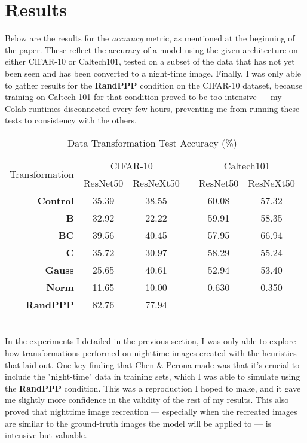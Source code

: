 \documentclass{article}
\begin{document}
\section{Results}
Below are the results for the \textit{accuracy} metric, as mentioned at the beginning of the paper. These reflect the accuracy of a model using the given architecture on either CIFAR-10 or Caltech101, tested on a subset of the data that has not yet been seen and has been converted to a night-time image. Finally, I was only able to gather results for the \textbf{RandPPP} condition on the CIFAR-10 dataset, because training on Caltech-101 for that condition proved to be too intensive --- my Colab runtimes disconnected every few hours, preventing me from running these tests to consistency with the others. 
\begin{table}[h] \centering
\caption{Data Transformation Test Accuracy (\%)}
\begin{tabular}{@{}r|ccccc@{}}\toprule
\multirow{2}{*}{Transformation} & \multicolumn{2}{c}{CIFAR-10} & \phantom{abc}& \multicolumn{2}{c}{Caltech101} \\
\cmidrule{2-3} \cmidrule{5-6}
& ResNet50 & ResNeXt50 && ResNet50 & ResNeXt50\\ \midrule
\textbf{Control} & 35.39 & 38.55 && 60.08 & 57.32 \\
\textbf{B} & 32.92 & 22.22 && 59.91 & 58.35 \\
\textbf{BC}& 39.56 & 40.45 && 57.95 & 66.94 \\
\textbf{C}& 35.72 & 30.97 && 58.29 & 55.24 \\
\textbf{Gauss}& 25.65 & 40.61 && 52.94 & 53.40 \\
\textbf{Norm}& 11.65 & 10.00 && 0.630 & 0.350 \\
\textbf{RandPPP}& 82.76 & 77.94 &&  &  \\
\bottomrule
\end{tabular}
\end{table}
\\ In the experiments I detailed in the previous section, I was only able to explore how transformations performed on nighttime images created with the heuristics that \cite{chenScotopic2015} laid out. One key finding that Chen \& Perona made was that it's crucial to include the "night-time" data in training sets, which I was able to simulate using the \textbf{RandPPP} condition. This was a reproduction I hoped to make, and it gave me slightly more confidence in the validity of the rest of my results. This also proved that nighttime image recreation --- especially when the recreated images are similar to the ground-truth images the model will be applied to --- is intensive but valuable.
\end{document}

